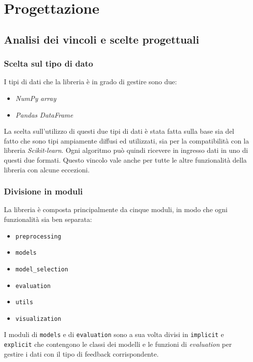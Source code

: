 \chapter{Progettazione}

\section{Analisi dei vincoli e scelte progettuali}

\subsection{Scelta sul tipo di dato}

I tipi di dati che la libreria è in grado di gestire sono due:

\begin{itemize}
    \item \textit{NumPy array}
    \item \textit{Pandas DataFrame}
\end{itemize}

La scelta sull'utilizzo di questi due tipi di dati è stata fatta sulla base sia del fatto che sono tipi ampiamente diffusi ed utilizzati, sia per la compatibilità con la libreria \textit{Scikit-learn}. Ogni algoritmo può quindi ricevere in ingresso dati in uno di questi due formati. Questo vincolo vale anche per tutte le altre funzionalità della libreria con alcune eccezioni.

\subsection{Divisione in moduli}

La libreria è composta principalmente da cinque moduli, in modo che ogni funzionalità sia ben separata:

\begin{itemize}
    \item \texttt{preprocessing}
    \item \texttt{models}
    \item \texttt{model\_selection}
    \item \texttt{evaluation}
    \item \texttt{utils}
    \item \texttt{visualization}
\end{itemize}

I moduli di \texttt{models} e di \texttt{evaluation} sono a sua volta divisi in \texttt{implicit} e \texttt{explicit} che contengono le classi dei modelli e le funzioni di \textit{evaluation} per gestire i dati con il tipo di feedback corrispondente.

